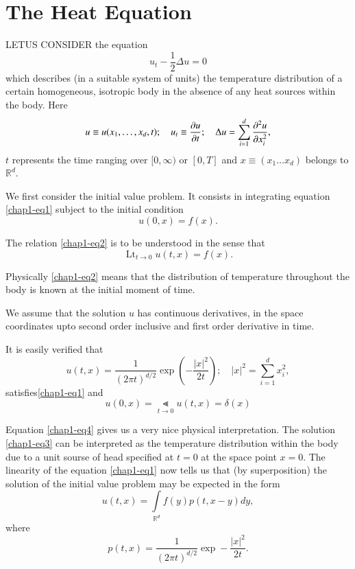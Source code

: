 \chapter{The Heat Equation}\label{chap1}

LET\pageoriginale US CONSIDER the equation
\begin{equation*}
u_{t}-\frac{1}{2}\Delta u=0\tag{1}\label{chap1-eq1}
\end{equation*}
which describes (in a suitable system of units) the temperature
distribution of a certain homogeneous, isotropic body in the absence
of any heat sources within the body. Here
$$
u\equiv u(x_{1},\ldots,x_{d},t);\quad u_{t}\equiv \frac{\partial u}{\partial
  t};\quad \Delta u=\sum^{d}_{i=1}\frac{\partial^{2}u}{\partial x^{2}_{i}},
$$
$t$ represents the time ranging over $[0,\infty)$ or $[0,T]$ and
  $x\equiv (x_{1}\ldots x_{d})$ belongs to $\mathbb{R}^{d}$. 

We first consider the initial value problem. It consists in
integrating equation \eqref{chap1-eq1} subject to the initial
condition
\begin{equation*}
u(0,x)=f(x).\tag{2}\label{chap1-eq2}
\end{equation*}

The relation \eqref{chap1-eq2} is to be understood in the sense that 
$$
{\displaystyle{\mathop{\text{Lt}}_{t\to 0}}}u(t,x)=f(x).
$$

Physically \eqref{chap1-eq2} means that the distribution of
temperature throughout the body is known at the initial moment of
time.

We assume that the solution $u$ has continuous derivatives, in the
space coordinates upto second order inclusive and first order
derivative in time.

It is easily verified that
\begin{equation*}
u(t,x)=\frac{1}{(2\pi t)^{d/2}}\exp
\left(-\frac{|x|^{2}}{2t}\right);\quad |x|^{2}=\sum^{d}_{i=1}x^{2}_{i},\tag{3}\label{chap1-eq3}
\end{equation*}
satisfies\pageoriginale \eqref{chap1-eq1} and
\begin{equation*}
u(0,x)=\Lt\limits_{t\to 0} u(t,x)=\delta (x)\tag{4}\label{chap1-eq4}
\end{equation*}

Equation \eqref{chap1-eq4} gives us a very nice physical
interpretation. The solution \eqref{chap1-eq3} can be interpreted as
the temperature distribution within the body due to a unit sourse of
head specified at $t=0$ at the space point $x=0$. The linearity of the
equation \eqref{chap1-eq1} now tells us that (by superposition) the
solution of the initial value problem may be expected in the form
\begin{equation*}
u(t,x)=\int\limits_{\mathbb{R}^{d}}f(y)p(t,x-y)dy,\tag{5}\label{chap1-eq5}
\end{equation*}
where
$$
p(t,x)=\frac{1}{(2\pi t)^{d/2}}\exp -\frac{|x|^{2}}{2t}.
$$

